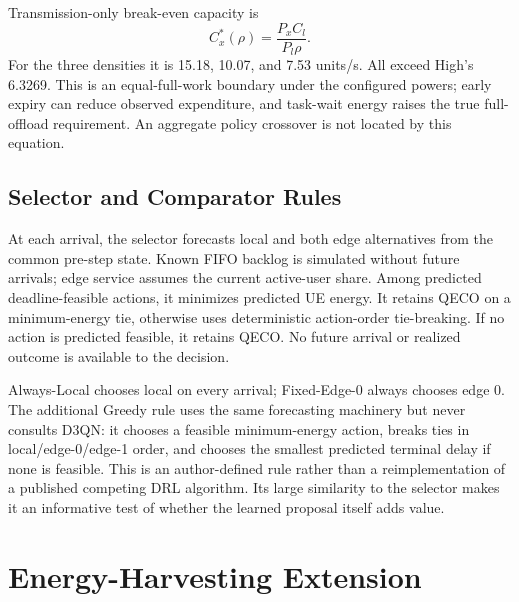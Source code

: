 \documentclass[conference]{IEEEtran}
\begin{document}
Transmission-only break-even capacity is
\begin{equation}
C_x^*(\rho)=\frac{P_xC_l}{P_l\rho}.
\label{eq:crossover}
\end{equation}
For the three densities it is 15.18, 10.07, and 7.53 units/s. All exceed High's 6.3269. This is an equal-full-work boundary under the configured powers; early expiry can reduce observed expenditure, and task-wait energy raises the true full-offload requirement. An aggregate policy crossover is not located by this equation.

\subsection{Selector and Comparator Rules}
At each arrival, the selector forecasts local and both edge alternatives from the common pre-step state. Known FIFO backlog is simulated without future arrivals; edge service assumes the current active-user share. Among predicted deadline-feasible actions, it minimizes predicted UE energy. It retains QECO on a minimum-energy tie, otherwise uses deterministic action-order tie-breaking. If no action is predicted feasible, it retains QECO. No future arrival or realized outcome is available to the decision.

Always-Local chooses local on every arrival; Fixed-Edge-0 always chooses edge 0. The additional Greedy rule uses the same forecasting machinery but never consults D3QN: it chooses a feasible minimum-energy action, breaks ties in local/edge-0/edge-1 order, and chooses the smallest predicted terminal delay if none is feasible. This is an author-defined rule rather than a reimplementation of a published competing DRL algorithm. Its large similarity to the selector makes it an informative test of whether the learned proposal itself adds value.

\section{Energy-Harvesting Extension}
\label{sec:ehmethod}
\end{document}

